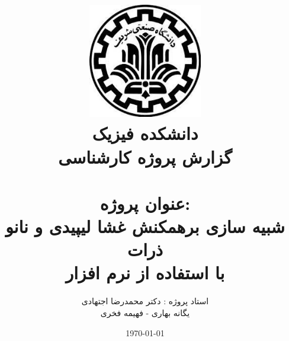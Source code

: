 \documentclass[12pt,onecolumn,a4paper]{report}
\begin{document}
\title{\includegraphics[width=5cm, height= 5cm]{3.jpg}\\\Large{دانشکده فیزیک}\\{\LARGE{گزارش پروژه کارشناسی}}\\{\\{\Huge{عنوان پروژه:}\\\Huge{شبیه سازی برهمکنش غشا لیپیدی و نانو ذرات \\با استفاده از نرم افزار  }}} }
\author{\LARGE{استاد پروژه : دکتر محمدرضا اجتهادی}\\\LARGE{یگانه بهاری - فهیمه فخری}}
\date{\LARGE{\today}}
\maketitle
\tableofcontents
\end{document}

